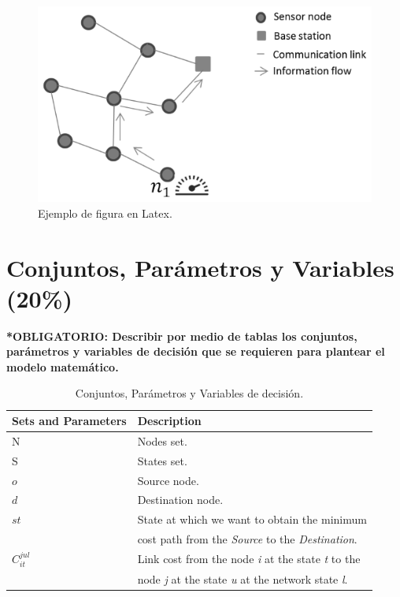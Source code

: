\documentclass[runningheads]{llncs}
\begin{document}
\begin{figure}[h]
	\begin{center}
		\centerline{\includegraphics[scale=0.8]{./figures/network.eps}}
		\caption{Ejemplo de figura en Latex. \label{Fig:fig2}}
	\end{center}
\end{figure}


\section{Conjuntos, Par\'{a}metros y Variables (20\%)}

\textbf{*OBLIGATORIO: Describir por medio de tablas los conjuntos, par\'{a}metros y variables de decisi\'{o}n que se requieren para plantear el modelo matem\'{a}tico.}

\begin{table}[h]
	\caption{Conjuntos, Par\'{a}metros y Variables de decisi\'{o}n. \label{Tab: tab1}}
	\begin{tabular*}{\hsize}{@{\extracolsep{\fill}}ll@{}}
		\hline
		\textbf{Sets and Parameters} & \textbf{Description}\\
		\hline
		N &   Nodes set.\\
		S  & States set. \\
		$o$  & Source node.\\
		$d$  & Destination node.\\
		$st$  & State at which we want to obtain the minimum  \\
		& cost path from the \textit{Source} to the \textit{Destination}.\\
		$C_{it}^{jul}$ & Link cost from the node \textit{i} at the state \textit{t} to the \\ 
		& node \textit{j} at the state \textit{u} at the network state \textit{l}.\\
		\hline
	\end{tabular*}
\end{table}
\end{document}
